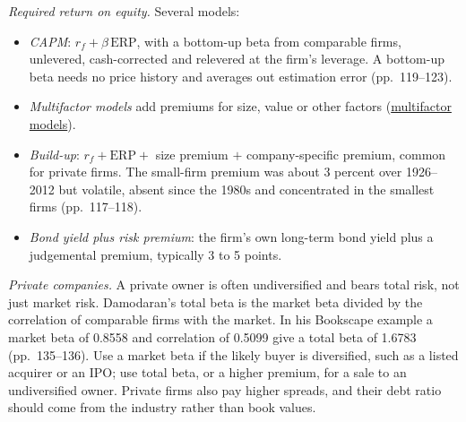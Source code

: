 \begin{qfmethod}
\emph{Required return on equity.} Several models:
\begin{itemize}
\item \emph{CAPM}: $r_f+\beta\,\mathrm{ERP}$, with a bottom-up beta from comparable firms, unlevered, cash-corrected and relevered at the firm's leverage. A bottom-up beta needs no price history and averages out estimation error (pp.~119--123).
\item \emph{Multifactor models} add premiums for size, value or other factors (\hyperref[mod:multifactor-apt]{multifactor models}).
\item \emph{Build-up}: $r_f+\mathrm{ERP}+$ size premium $+$ company-specific premium, common for private firms. The small-firm premium was about 3 percent over 1926--2012 but volatile, absent since the 1980s and concentrated in the smallest firms (pp.~117--118).
\item \emph{Bond yield plus risk premium}: the firm's own long-term bond yield plus a judgemental premium, typically 3 to 5 points.
\end{itemize}

\emph{Private companies.} A private owner is often undiversified and bears total risk, not just market risk. Damodaran's total beta is the market beta divided by the correlation of comparable firms with the market. In his Bookscape example a market beta of 0.8558 and correlation of 0.5099 give a total beta of 1.6783 (pp.~135--136). Use a market beta if the likely buyer is diversified, such as a listed acquirer or an IPO; use total beta, or a higher premium, for a sale to an undiversified owner. Private firms also pay higher spreads, and their debt ratio should come from the industry rather than book values.


\end{qfmethod}
